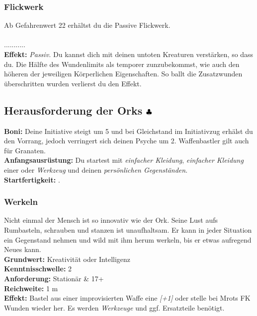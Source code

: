 \subsubsection*{ Flickwerk} \label{sk:flickwerk}
Ab Gefahrenwert 22 erhältst du die Passive Flickwerk.\\
\\
........... \\
\textbf{Effekt:} \textit{Passiv.} Du kannst dich mit deinen untoten Kreaturen verstärken, so dass du. Die Hälfte des Wundenlimits als temporer zunzubekommst, wie auch den höheren der jeweiligen Körperlichen Eigenschaften. So ballt die Zusatzwunden überschritten wurden verlierst du den Effekt.


\subsection*{Herausforderung der Orks ${\color{blue} }{\color{black}\clubsuit}$}
\textbf{Boni:} Deine Initiative steigt um 5 und bei Gleichstand im Initiativzug erhälst du den Vorrang, jedoch verringert sich deinen Psyche um 2. Waffenbastler gilt auch für Granaten.\\
\textbf{Anfangsausrüstung:} Du startest mit \textit{einfacher Kleidung}, \textit{einfacher Kleidung} einer  oder \textit{Werkzeug} und deinen \textit{persönlichen Gegenständen}. \\
\textbf{Startfertigkeit:} .

\subsubsection*{ Werkeln} \label{sk:werkeln}
Nicht einmal der Mensch ist so innovativ wie der Ork. Seine Lust aufs Rumbasteln, schrauben und stanzen ist unaufhaltsam. Er kann in jeder Situation ein Gegenstand nehmen und wild mit ihm herum werkeln, bis er etwas aufregend Neues kann.\\
\textbf{Grundwert:} Kreativität oder Intelligenz \\
\textbf{Kenntnisschwelle:} 2 \\
\textbf{Anforderung:} Stationär \& 17+ \\
\textbf{Reichweite:} 1 m \\
\textbf{Effekt:} Bastel aus einer improvisierten Waffe eine \textit{[+1]} oder stelle bei Mrots FK Wunden wieder her. Es werden \textit{Werkzeuge} und ggf. Ersatzteile benötigt.

